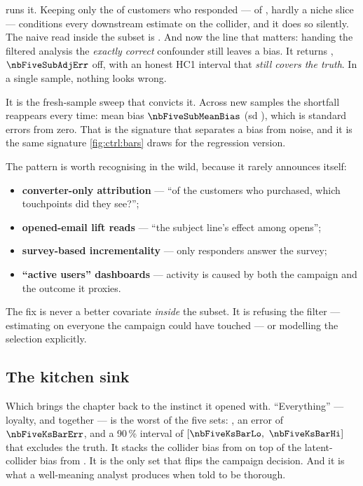  runs it. Keeping only the \pc{\nbFiveSubPct} of customers who responded ---
\nbFiveSubN{} of \nbFiveN{}, hardly a niche slice --- conditions every downstream estimate on the
 collider, and it does so silently. The naive read inside the subset is
\eur{\nbFiveSubNaiveEst}. And now the line that matters: handing the filtered analysis the
\emph{exactly correct} confounder still leaves a bias. It returns \eur{\nbFiveSubAdjEst},
$\nbFiveSubAdjErr$ off, with an honest HC1 interval that \emph{still covers the truth}. In a
single sample, nothing looks wrong.



It is the fresh-sample sweep that convicts it. Across \nbFiveSubNs{} new samples the shortfall
reappears every time: mean bias $\nbFiveSubMeanBias$ (sd \eur{\nbFiveSubSdBias}), which is
\nbFiveSubT{} standard errors from zero. That is the signature that separates a bias from noise,
and it is the same signature \cref{fig:ctrl:bars} draws for the regression version.

The pattern is worth recognising in the wild, because it rarely announces itself:

\begin{itemize}[leftmargin=*, itemsep=.15em]
  \item \textbf{converter-only attribution} --- ``of the customers who purchased, which
        touchpoints did they see?'';
  \item \textbf{opened-email lift reads} --- ``the subject line's effect among opens'';
  \item \textbf{survey-based incrementality} --- only responders answer the survey;
  \item \textbf{``active users'' dashboards} --- activity is caused by both the campaign and the
        outcome it proxies.
\end{itemize}

The fix is never a better covariate \emph{inside} the subset. It is refusing the filter ---
estimating on everyone the campaign could have touched --- or modelling the selection explicitly.

\subsection*{The kitchen sink}

Which brings the chapter back to the instinct it opened with. ``Everything'' --- loyalty,
 and  together --- is the worst of the five sets:
\eur{\nbFiveKsBar}, an error of $\nbFiveKsBarErr$, and a 90\,\% interval of
$[\nbFiveKsBarLo,\ \nbFiveKsBarHi]$ that excludes the truth. It stacks the collider bias from
 on top of the latent-collider bias from . It is the only set
that flips the campaign decision. And it is what a well-meaning analyst produces when told to be
thorough.

